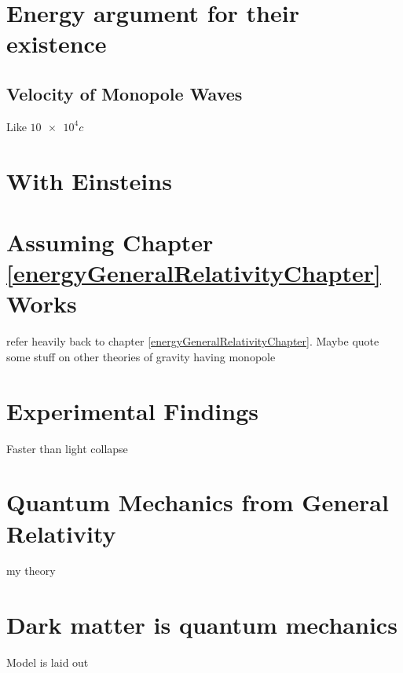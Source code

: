 \documentclass[../rzero]{subfiles}
\begin{document}
\section{Energy argument for their existence}

\subsection{Velocity of Monopole Waves}
	Like $\num{10e4} c$ 

\section{With Einsteins }

\section{Assuming Chapter \ref{energyGeneralRelativityChapter} Works}
	refer heavily back to chapter \ref{energyGeneralRelativityChapter}. Maybe quote some stuff on other theories of gravity having monopole 

\section{Experimental Findings}
Faster than light collapse



\section{Quantum Mechanics from General Relativity}
my theory


\section{Dark matter is quantum mechanics}
	Model is laid out 
\end{document}
